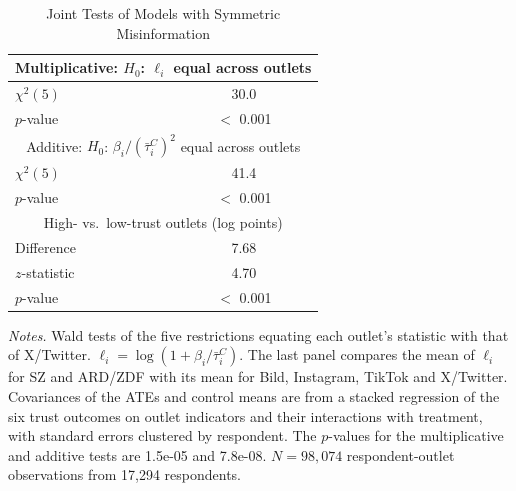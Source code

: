 \begin{table}[H]
\centering
\caption{Joint Tests of Models with Symmetric Misinformation}
\label{tab:symmetric_tests}
\begin{tabular}{lc}
\toprule
\multicolumn{2}{c}{Multiplicative: $H_0$: $\ell_i$ equal across outlets} \\
\midrule
$\chi^2(5)$ & 30.0 \\
$p$-value & $<$ 0.001 \\
\midrule
\multicolumn{2}{c}{Additive: $H_0$: $\beta_i/(\bar{\tau}_i^C)^2$ equal across outlets} \\
\midrule
$\chi^2(5)$ & 41.4 \\
$p$-value & $<$ 0.001 \\
\midrule
\multicolumn{2}{c}{High- vs.\ low-trust outlets (log points)} \\
\midrule
Difference & 7.68 \\
$z$-statistic & 4.70 \\
$p$-value & $<$ 0.001 \\
\bottomrule
\end{tabular}
\par
\begin{minipage}{\linewidth}
\baselineskip9pt {\scriptsize \vspace{0.1cm} {\it Notes.} Wald tests of the five restrictions equating each outlet's statistic with that of X/Twitter. $\ell_i=\log(1+\beta_i/\bar{\tau}_i^C)$. The last panel compares the mean of $\ell_i$ for SZ and ARD/ZDF with its mean for Bild, Instagram, TikTok and X/Twitter. Covariances of the ATEs and control means are from a stacked regression of the six trust outcomes on outlet indicators and their interactions with treatment, with standard errors clustered by respondent. The $p$-values for the multiplicative and additive tests are 1.5e-05 and 7.8e-08. $N=98,074$ respondent-outlet observations from 17,294 respondents.}
\end{minipage}
\end{table}

